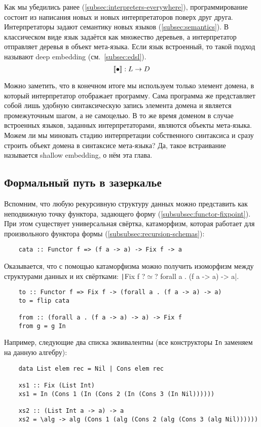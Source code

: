
Как мы убедились ранее (\ref{subsec:interpreters-everywhere}), программирование состоит из написания новых и новых интерпретаторов поверх друг друга.
Интерпретаторы задают семантику новых языков (\ref{subsec:semantics}).
В классическом виде язык задаётся как множество деревьев, а интерпретатор отправляет деревья в объект мета-языка.
Если язык встроенный, то такой подход называют deep embedding (см.~\ref{subsec:edsl}).
\[
    \llbracket{\bullet}\rrbracket : L \to D
\]

Можно заметить, что в конечном итоге мы используем только элемент домена, в который интерпретатор отображает программу.
Сама программа же представляет собой лишь удобную синтаксическую запись элемента домена и является промежуточным шагом, а не самоцелью.
В то же время доменом в случае встроенных языков, заданных интерпретаторами, являются объекты мета-языка.
Можем ли мы миновать стадию интерпретации собственного синтаксиса и сразу строить объект домена в синтаксисе мета-языка?
Да, такое встраивание называется shallow embedding, о нём эта глава.

\subsection{Формальный путь в зазеркалье} \label{subsec:to-wonderland}

Вспомним, что любую рекурсивную структуру данных можно представить как неподвижную точку функтора, задающего форму (\ref{subsubsec:functor-fixpoint}).
При этом существует универсальная свёртка, катаморфизм, которая работает для произвольного функтора формы (\ref{subsubsec:recursion-schemas}):
\begin{verbatim}
    cata :: Functor f => (f a -> a) -> Fix f -> a
\end{verbatim}

Оказывается, что с помощью катаморфизма можно получить изоморфизм между структурами данных и их свёртками:
\texttt|Fix f ?$\simeq$? forall a . (f a -> a) -> a|.
\begin{verbatim}
    to :: Functor f => Fix f -> (forall a . (f a -> a) -> a)
    to = flip cata

    from :: (forall a . (f a -> a) -> a) -> Fix f
    from g = g In
\end{verbatim}

Например, следующие два списка эквивалентны (все конструкторы \texttt{In} заменяем на данную алгебру):
\begin{verbatim}
    data List elem rec = Nil | Cons elem rec

    xs1 :: Fix (List Int)
    xs1 = In (Cons 1 (In (Cons 2 (In (Cons 3 (In Nil))))))

    xs2 :: (List Int a -> a) -> a
    xs2 = \alg -> alg (Cons 1 (alg (Cons 2 (alg (Cons 3 (alg Nil))))))
\end{verbatim}

